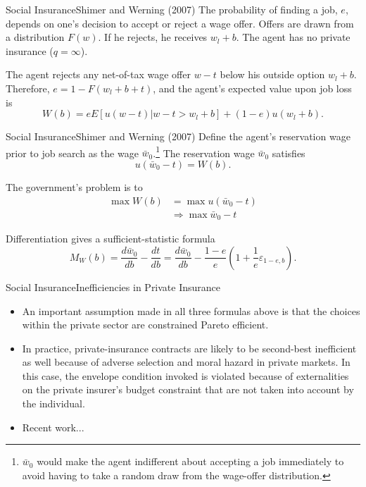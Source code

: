 \documentclass{beamer}
\begin{document}
\begin{frame}{Social Insurance}{Shimer and Werning (2007)}
	The probability of finding a job, $e$, depends on one's decision to accept or reject a wage offer. Offers are drawn from a distribution $F(w)$. If he rejects, he receives $w_l+b$. The agent has no private insurance ($q=\infty$).
	\medskip

	The agent rejects any net-of-tax wage offer $w-t$ below his outside option $w_l+b$. Therefore, $e=1-F(w_l+b+t)$, and the agent's expected value upon job loss is
	\begin{equation}
		W(b) = eE\left[u(w-t)|w-t>w_l+b\right] + (1-e)u(w_l+b).
	\end{equation}
\end{frame}
\begin{frame}{Social Insurance}{Shimer and Werning (2007)}
	Define the agent’s reservation wage prior to job search as the wage $\bar{w}_0$.\footnote{$\bar{w}_0$ would make the agent indifferent about accepting a job immediately to avoid having to take a random draw from the wage-offer distribution.}
	The reservation wage $\bar{w}_0$ satisfies
	\begin{equation}
		u(\bar{w}_0-t) = W(b).
	\end{equation}

	The government's problem is to
	\begin{equation}
		\begin{aligned}
			\max W(b) &= \max u(\bar{w}_0-t) \\
			&\Rightarrow \max \bar{w}_0-t
		\end{aligned}
	\end{equation}

	Differentiation gives a sufficient-statistic formula
	\begin{equation}
		M_W(b) = \frac{d\bar{w}_0}{db}-\frac{dt}{db} = \frac{d\bar{w}_0}{db}-\frac{1-e}{e}\left(1+\frac{1}{e}\varepsilon_{1-e,b}\right).
	\end{equation}
\end{frame}
\begin{frame}{Social Insurance}{Inefficiencies in Private Insurance}
	\begin{itemize}
		\item An important assumption made in all three formulas above is that the choices within the private sector are constrained Pareto efficient.
		\item In practice, private-insurance contracts are likely to be second-best inefficient as well because of adverse selection and moral hazard in private markets. In this case, the envelope condition invoked is violated because of externalities on the private insurer’s budget constraint that are not taken into account by the individual.
		\item Recent work...
	\end{itemize}
\end{frame}
\end{document}
